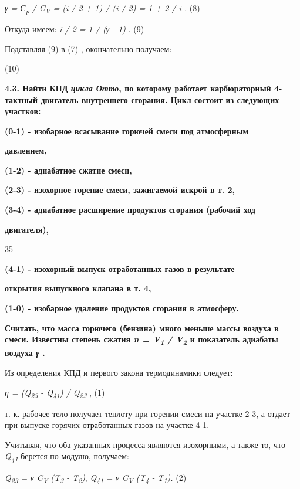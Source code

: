 \emph{γ = С\textsubscript{p} / C\textsubscript{V} = (i / 2 + 1) / (i /
2) = 1 + 2 / i .} (8)

Откуда имеем: \emph{i / 2 = 1 / (γ - 1)} . (9)

Подставляя (9) в (7) , окончательно получаем:

(10)

\textbf{4.3. Найти КПД \emph{цикла Отто}, по которому работает
карбюраторный 4-тактный двигатель внутреннего сгорания. Цикл состоит из
следующих участков:}

\textbf{(0-1) - изобарное всасывание горючей смеси под атмосферным}

\textbf{давлением,}

\textbf{(1-2) - адиабатное сжатие смеси,}

\textbf{(2-3) - изохорное горение смеси, зажигаемой искрой в т. 2,}

\textbf{(3-4) - адиабатное расширение продуктов сгорания (рабочий ход}

\textbf{двигателя),}

35

\textbf{(4-1) - изохорный выпуск отработанных газов в результате}

\textbf{открытия выпускного клапана в т. 4,}

\textbf{(1-0) - изобарное удаление продуктов сгорания в атмосферу.}

\textbf{Считать, что масса горючего (бензина) много меньше массы воздуха
в смеси. Известны степень сжатия \emph{n = V\textsubscript{1} /
V\textsubscript{2}} и показатель адиабаты воздуха \emph{γ} .}

\solving{}

Из определения КПД и первого закона термодинамики следует:

\emph{η = (Q\textsubscript{23} - Q\textsubscript{41}) /
Q\textsubscript{23}} , (1)

т. к. рабочее тело получает теплоту при горении смеси на участке 2-3, а
отдает - при выпуске горячих отработанных газов на участке 4-1.


Учитывая, что оба указанных процесса являются изохорными, а также то,
что \emph{Q\textsubscript{41}} берется по модулю, получаем:

\emph{Q\textsubscript{23} = ν C\textsubscript{V} (T\textsubscript{3} -
T\textsubscript{2})}, \emph{Q\textsubscript{41} = ν C\textsubscript{V}
(T\textsubscript{4} - T\textsubscript{1}).} (2)

